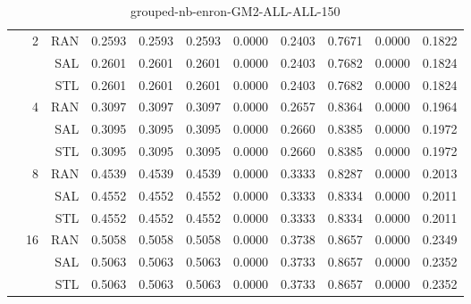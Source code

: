 \begin{center}
\begin{table}[htbp]
\begin{tabular}{ | r | r | r | r | r | r | r | r | r | r | r |}
 & \multirow{3}{*}{2} & RAN & 0.2593 & 0.2593 & 0.2593 & 0.0000 & 0.2403 & 0.7671 & 0.0000 & 0.1822\\ \cline{3-11}
 &   & SAL & 0.2601 & 0.2601 & 0.2601 & 0.0000 & 0.2403 & 0.7682 & 0.0000 & 0.1824\\ \cline{3-11}
 &   & STL & 0.2601 & 0.2601 & 0.2601 & 0.0000 & 0.2403 & 0.7682 & 0.0000 & 0.1824\\ \cline{2-11}
 & \multirow{3}{*}{4} & RAN & 0.3097 & 0.3097 & 0.3097 & 0.0000 & 0.2657 & 0.8364 & 0.0000 & 0.1964\\ \cline{3-11}
 &   & SAL & 0.3095 & 0.3095 & 0.3095 & 0.0000 & 0.2660 & 0.8385 & 0.0000 & 0.1972\\ \cline{3-11}
 &   & STL & 0.3095 & 0.3095 & 0.3095 & 0.0000 & 0.2660 & 0.8385 & 0.0000 & 0.1972\\ \cline{2-11}
 & \multirow{3}{*}{8} & RAN & 0.4539 & 0.4539 & 0.4539 & 0.0000 & 0.3333 & 0.8287 & 0.0000 & 0.2013\\ \cline{3-11}
 &   & SAL & 0.4552 & 0.4552 & 0.4552 & 0.0000 & 0.3333 & 0.8334 & 0.0000 & 0.2011\\ \cline{3-11}
 &   & STL & 0.4552 & 0.4552 & 0.4552 & 0.0000 & 0.3333 & 0.8334 & 0.0000 & 0.2011\\ \cline{2-11}
 & \multirow{3}{*}{16} & RAN & 0.5058 & 0.5058 & 0.5058 & 0.0000 & 0.3738 & 0.8657 & 0.0000 & 0.2349\\ \cline{3-11}
 &   & SAL & 0.5063 & 0.5063 & 0.5063 & 0.0000 & 0.3733 & 0.8657 & 0.0000 & 0.2352\\ \cline{3-11}
 &   & STL & 0.5063 & 0.5063 & 0.5063 & 0.0000 & 0.3733 & 0.8657 & 0.0000 & 0.2352\\ \cline{2-11}
\hline
\end{tabular}
\caption{grouped-nb-enron-GM2-ALL-ALL-150}
\end{table}
\end{center}

